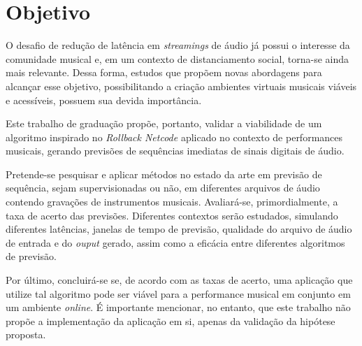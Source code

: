 \chapter{Objetivo}

O desafio de redução de latência em \textit{streamings} de áudio já possui o interesse da comunidade musical e, em um contexto de distanciamento social, torna-se ainda mais relevante. Dessa forma, estudos que propõem novas abordagens para alcançar esse objetivo, possibilitando a criação ambientes virtuais musicais viáveis e acessíveis, possuem sua devida importância.

Este trabalho de graduação propõe, portanto, validar a viabilidade de um algoritmo inspirado no \textit{Rollback Netcode} aplicado no contexto de performances musicais, gerando previsões de sequências imediatas de sinais digitais de áudio.

Pretende-se pesquisar e aplicar métodos no estado da arte em previsão de sequência, sejam supervisionadas ou não, em diferentes arquivos de áudio contendo gravações de instrumentos musicais. Avaliará-se, primordialmente, a taxa de acerto das previsões. Diferentes contextos serão estudados, simulando diferentes latências, janelas de tempo de previsão, qualidade do arquivo de áudio de entrada e do \textit{ouput} gerado, assim como a eficácia entre diferentes algoritmos de previsão.

Por último, concluirá-se se, de acordo com as taxas de acerto, uma aplicação que utilize tal algoritmo pode ser viável para a performance musical em conjunto em um ambiente \textit{online}. É importante mencionar, no entanto, que este trabalho não propõe a implementação da aplicação em si, apenas da validação da hipótese proposta.
